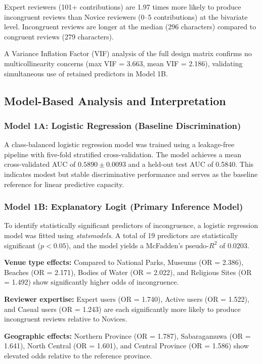 \documentclass[conference]{IEEEtran}
\begin{document}
Expert reviewers (101+ contributions) are 1.97 times more likely to produce incongruent reviews than Novice reviewers (0--5 contributions) at the bivariate level. Incongruent reviews are longer at the median (296 characters) compared to congruent reviews (279 characters).

A Variance Inflation Factor (VIF) analysis of the full design matrix confirms no multicollinearity concerns (max VIF = 3.663, mean VIF = 2.186), validating simultaneous use of retained predictors in Model 1B.

\subsection{Model-Based Analysis and Interpretation}
\subsubsection{Model 1A: Logistic Regression (Baseline Discrimination)}
A class-balanced logistic regression model was trained using a leakage-free pipeline with five-fold stratified cross-validation. The model achieves a mean cross-validated AUC of $0.5890 \pm 0.0093$ and a held-out test AUC of 0.5840. This indicates modest but stable discriminative performance and serves as the baseline reference for linear predictive capacity.

\subsubsection{Model 1B: Explanatory Logit (Primary Inference Model)}
To identify statistically significant predictors of incongruence, a logistic regression model was fitted using \textit{statsmodels}. A total of 19 predictors are statistically significant ($p<0.05$), and the model yields a McFadden's pseudo-$R^2$ of 0.0203.

\textbf{Venue type effects:} Compared to National Parks, Museums (OR = 2.386), Beaches (OR = 2.171), Bodies of Water (OR = 2.022), and Religious Sites (OR = 1.492) show significantly higher odds of incongruence.

\textbf{Reviewer expertise:} Expert users (OR = 1.740), Active users (OR = 1.522), and Casual users (OR = 1.243) are each significantly more likely to produce incongruent reviews relative to Novices.

\textbf{Geographic effects:} Northern Province (OR = 1.787), Sabaragamuwa (OR = 1.641), North Central (OR = 1.601), and Central Province (OR = 1.586) show elevated odds relative to the reference province.
\end{document}

